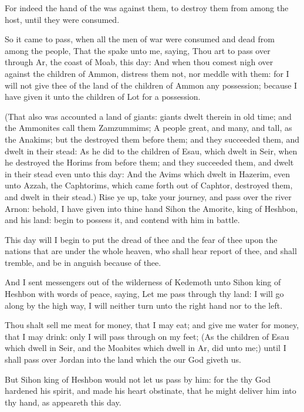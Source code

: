 \Verse For indeed the hand of the \LORD was against them, to destroy them from among the host, until they were consumed.

\Verse So it came to pass, when all the men of war were consumed and dead from among the people, \Verse That the \LORD spake unto me, saying, \Verse Thou art to pass over through Ar, the coast of Moab, this day: \Verse And when thou comest nigh over against the children of Ammon, distress them not, nor meddle with them: for I will not give thee of the land of the children of Ammon any possession; because I have given it unto the children of Lot for a possession.

\Verse (That also was accounted a land of giants: giants dwelt therein in old time; and the Ammonites call them Zamzummims; \Verse A people great, and many, and tall, as the Anakims; but the \LORD destroyed them before them; and they succeeded them, and dwelt in their stead: \Verse As he did to the children of Esau, which dwelt in Seir, when he destroyed the Horims from before them; and they succeeded them, and dwelt in their stead even unto this day: \Verse And the Avims which dwelt in Hazerim, even unto Azzah, the Caphtorims, which came forth out of Caphtor, destroyed them, and dwelt in their stead.)  \Verse Rise ye up, take your journey, and pass over the river Arnon: behold, I have given into thine hand Sihon the Amorite, king of Heshbon, and his land: begin to possess it, and contend with him in battle.

\Verse This day will I begin to put the dread of thee and the fear of thee upon the nations that are under the whole heaven, who shall hear report of thee, and shall tremble, and be in anguish because of thee.

\Verse And I sent messengers out of the wilderness of Kedemoth unto Sihon king of Heshbon with words of peace, saying, \Verse Let me pass through thy land: I will go along by the high way, I will neither turn unto the right hand nor to the left.

\Verse Thou shalt sell me meat for money, that I may eat; and give me water for money, that I may drink: only I will pass through on my feet; \Verse (As the children of Esau which dwell in Seir, and the Moabites which dwell in Ar, did unto me;) until I shall pass over Jordan into the land which the \LORD our God giveth us.

\Verse But Sihon king of Heshbon would not let us pass by him: for the \LORD thy God hardened his spirit, and made his heart obstinate, that he might deliver him into thy hand, as appeareth this day.

